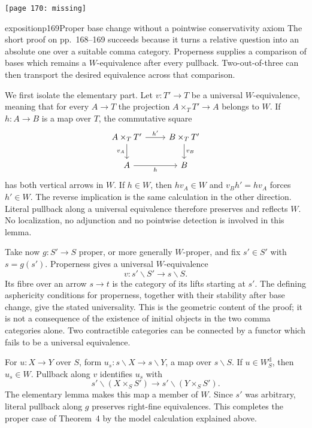 \texttt{[page 170: missing]}

\setcounter{footnote}{81}



\begin{dcomment}{exposition}{p169}{Proper base change without a pointwise conservativity axiom}
The short proof on pp.~168--169 succeeds because it turns a relative question into an absolute one over a suitable comma category. Properness supplies a comparison of bases which remains a $W$-equivalence after every pullback. Two-out-of-three can then transport the desired equivalence across that comparison.

We first isolate the elementary part. Let $v:T'\to T$ be a universal $W$-equivalence, meaning that for every $A\to T$ the projection $A\times_TT'\to A$ belongs to $W$. If $h:A\to B$ is a map over $T$, the commutative square
\[
\begin{tikzcd}
 A\times_TT' \arrow[r,"h'"]\arrow[d,"v_A"']&
 B\times_TT'\arrow[d,"v_B"]\\
 A\arrow[r,"h"']&B
\end{tikzcd}
\]
has both vertical arrows in $W$. If $h\in W$, then $hv_A\in W$ and $v_Bh'=hv_A$ forces $h'\in W$. The reverse implication is the same calculation in the other direction. Literal pullback along a universal equivalence therefore preserves and reflects $W$. No localization, no adjunction and no pointwise detection is involved in this lemma.

Take now $g:S'\to S$ proper, or more generally $W$-proper, and fix $s'\in S'$ with $s=g(s')$. Properness gives a universal $W$-equivalence
\[
 v:s'\backslash S'\longrightarrow s\backslash S.
\]
Its fibre over an arrow $s\to t$ is the category of its lifts starting at $s'$. The defining asphericity conditions for properness, together with their stability after base change, give the stated universality. This is the geometric content of the proof; it is not a consequence of the existence of initial objects in the two comma categories alone. Two contractible categories can be connected by a functor which fails to be a universal equivalence.

For $u:X\to Y$ over $S$, form $u_s:s\backslash X\to s\backslash Y$, a map over $s\backslash S$. If $u\in W_S^{\mathrm d}$, then $u_s\in W$. Pullback along $v$ identifies $u_s$ with
\[
 s'\backslash(X\times_SS')\longrightarrow
 s'\backslash(Y\times_SS').
\]
The elementary lemma makes this map a member of $W$. Since $s'$ was arbitrary, literal pullback along $g$ preserves right-fine equivalences. This completes the proper case of Theorem~4 by the model calculation explained above.


\end{dcomment}
